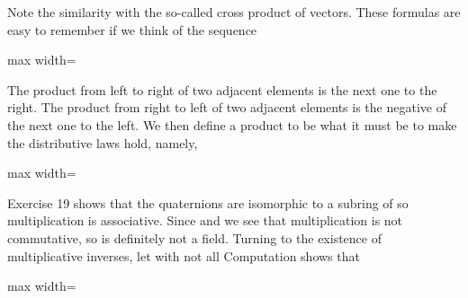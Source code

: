 \documentclass[11pt,oneside]{article}
\begin{document}
\begin{BookBody}

\noindent Note the similarity with the so-called cross product of vectors. These formulas are easy to remember if we think of the sequence

\begin{center}\begin{adjustbox}{max width=\linewidth}\end{adjustbox}\end{center}

\noindent The product from left to right of two adjacent elements is the next one to the right. The product from right to left of two adjacent elements is the negative of the next one to the left. We then define a product to be what it must be to make the distributive laws hold, namely,

\begin{center}\begin{adjustbox}{max width=\linewidth}\end{adjustbox}\end{center}

Exercise 19 shows that the quaternions are isomorphic to a subring of  so multiplication is associative. Since  and  we see that multiplication is not commutative, so  is definitely not a field. Turning to the existence of multiplicative inverses, let  with not all  Computation shows that

\begin{center}\begin{adjustbox}{max width=\linewidth}\end{adjustbox}\end{center}


\end{BookBody}
\end{document}
